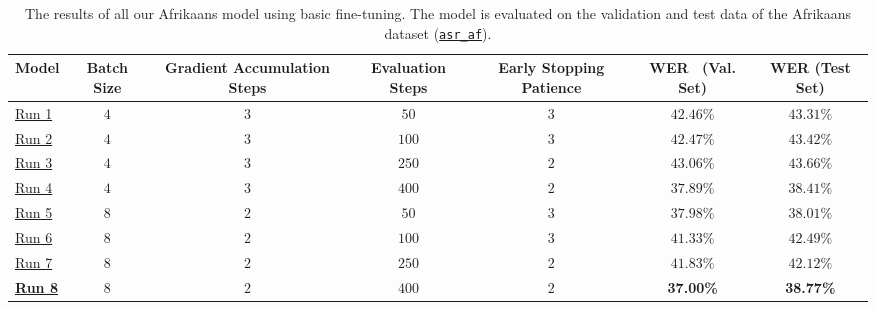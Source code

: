 \begin{table}[!h]
    \mytable
    \caption{The results of all our Afrikaans model using basic fine-tuning. 
    The model is evaluated on the validation and test data of the Afrikaans dataset (\href{https://huggingface.co/datasets/lucas-meyer/asr_af}{\texttt{asr\_af}}).}
    \begin{tabularx}{\linewidth}{@{}lCCCCCC@{}}
        \toprule
        Model                                                                               & Batch Size & Gradient Accumulation Steps & Evaluation Steps & Early Stopping Patience & \textbf{WER \ (Val. Set)} & \textbf{WER (Test Set)} \\
        \midrule
        \href{https://huggingface.co/lucas-meyer/xls-r-asr_af-run1}{Run 1}                  & $4$ & $3$ & $50$ & $3$ & $42.46\%$ & $43.31\%$  \\
        \href{https://huggingface.co/lucas-meyer/xls-r-asr_af-run2}{Run 2}                  & $4$ & $3$ & $100$ & $3$ & $42.47\%$ & $43.42\%$  \\
        \href{https://huggingface.co/lucas-meyer/xls-r-asr_af-run3}{Run 3}                  & $4$ & $3$ & $250$ & $2$ & $43.06\%$ & $43.66\%$  \\
        \href{https://huggingface.co/lucas-meyer/xls-r-asr_af-run4}{Run 4}                  & $4$ & $3$ & $400$ & $2$ & $37.89\%$ & $38.41\%$  \\
        \href{https://huggingface.co/lucas-meyer/xls-r-asr_af-run5}{Run 5}                  & $8$ & $2$ & $50$ & $3$ &  $37.98\%$ & $38.01\%$  \\
        \href{https://huggingface.co/lucas-meyer/xls-r-asr_af-run6}{Run 6}                  & $8$ & $2$ & $100$ & $3$ & $41.33\%$ & $42.49\%$  \\
        \href{https://huggingface.co/lucas-meyer/xls-r-asr_af-run7}{Run 7}                  & $8$ & $2$ & $250$ & $2$ & $41.83\%$ & $42.12\%$  \\
        \href{https://huggingface.co/lucas-meyer/xls-r-asr_af-run8}{\textbf{Run 8}}         & $8$ & $2$ & $400$ & $2$ & \textbf{37.00\%} & \textbf{38.77\%} \\
        \bottomrule
    \end{tabularx}
    \label{tbl:full-basic-af}
\end{table}

\newpage
